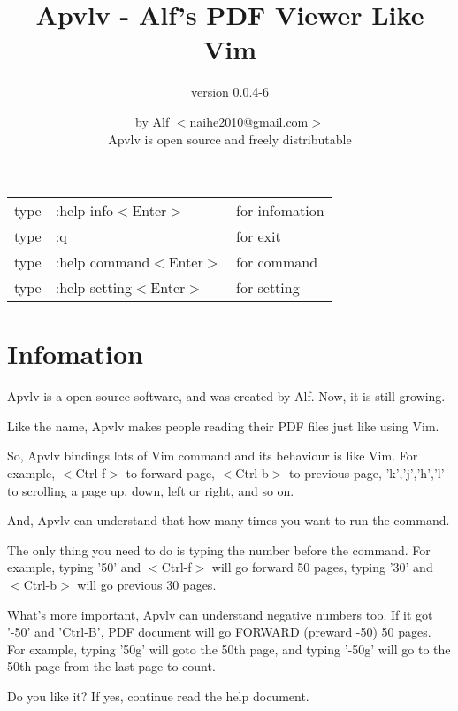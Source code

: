 \documentclass[a4paper,12pt]{article}
\begin{document}
\large

\title{Apvlv - Alf's PDF Viewer Like Vim}
\author{version 0.0.4-6}
\date{by Alf $<$naihe2010@gmail.com$>$ \\Apvlv is open source and freely distributable}
\maketitle{}

\begin{center}
\begin{tabular}{lll}
type & :help info$<$Enter$>$      & for infomation \\
type & :q                         & for exit \\
type & :help command$<$Enter$>$   & for command \\
type & :help setting$<$Enter$>$   & for setting \\
\end{tabular}
\end{center}

\newpage

\section{Infomation}

Apvlv is a open source software, and was created by Alf. Now, it is still growing.

Like the name, Apvlv makes people reading their PDF files just like using Vim.

So, Apvlv bindings lots of Vim command and its behaviour is like Vim. For example, $<$Ctrl-f$>$ to forward page, $<$Ctrl-b$>$ to previous page, 'k','j','h','l' to scrolling a page up, down, left or right, and so on. 

And, Apvlv can understand that how many times you want to run the command.

The only thing you need to do is typing the number before the command. For example, typing '50' and $<$Ctrl-f$>$ will go forward 50 pages, typing '30' and $<$Ctrl-b$>$ will go previous 30 pages.

What's more important, Apvlv can understand negative numbers too. If it got '-50' and 'Ctrl-B', PDF document will go FORWARD (preward -50) 50 pages. For example, typing '50g' will goto the 50th page, and typing '-50g' will go to the 50th page from the last page to count.

Do you like it? If yes, continue read the help document.
\end{document}
